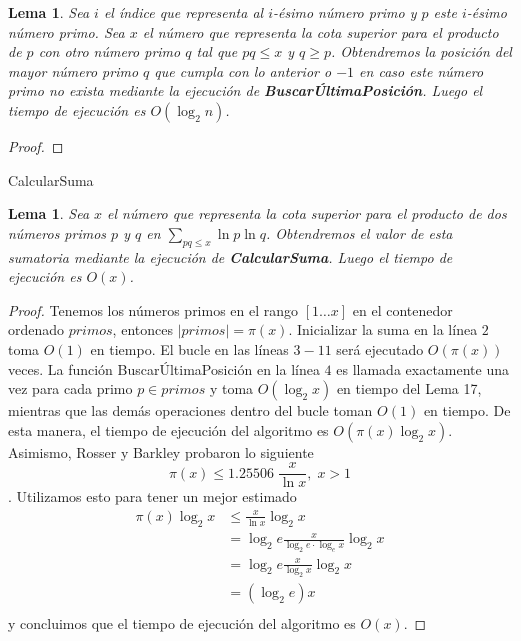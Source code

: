 \documentclass{article}
\newtheorem{lemma}[theorem]{Lema}
\theoremstyle{definition}
\theoremstyle{remark}
\begin{document}
\begin{lemma}
Sea $i$ el \'indice que representa al $i$-\'esimo n\'umero primo
y $p$ este $i$-\'esimo n\'umero primo.
Sea $x$ el n\'umero que representa la cota superior para el producto de $p$ con otro n\'umero primo $q$ tal que $pq \leq x$ y $q \geq p$.
Obtendremos la posici\'on del mayor n\'umero primo $q$ que cumpla con lo anterior o
$-1$ en caso este n\'umero primo no exista
mediante la ejecuci\'on de \textbf{Buscar\'UltimaPosici\'on}.
Luego el tiempo de ejecuci\'on es $O(\log_2 n)$.
\end{lemma}

\begin{proof}
\end{proof}

\begin{algorithm}[H]
\SetAlgoLined
\DontPrintSemicolon
{}
\caption{CalcularSuma\label{CS}}
\end{algorithm}

\begin{lemma}
Sea $x$ el n\'umero que representa la cota superior para el producto de dos n\'umeros primos
$p$ y $q$ en $\sum_{pq \leq x} \ln p \ln q$.
Obtendremos el valor de esta sumatoria mediante la ejecuci\'on de \textbf{CalcularSuma}.
Luego el tiempo de ejecuci\'on es $O(x)$.
\end{lemma}

\begin{proof}
Tenemos los n\'umeros primos en el rango $[1 \dots x]$ en el contenedor ordenado $primos$,
entonces $|primos| = \pi(x)$.
Inicializar la suma en la l\'inea $2$ toma $O(1)$ en tiempo.
El bucle en las l\'ineas $3-11$ ser\'a ejecutado $O(\pi(x))$ veces.
La funci\'on Buscar\'UltimaPosici\'on en la l\'inea $4$ es llamada exactamente una vez para cada primo $p \in primos$ y
toma $O(\log_2 x)$ en tiempo del Lema 17, mientras que las dem\'as operaciones dentro del bucle
toman $O(1)$ en tiempo.
De esta manera, el tiempo de ejecuci\'on del algoritmo es $O(\pi(x)\log_2 x)$.
Asimismo, Rosser y Barkley probaron lo siguiente \cite[Teorema 2, Corolario 1]{Chebyshev}
$$\pi(x) \leq 1.25506\;\frac{x}{\ln x},\;x > 1$$.
Utilizamos esto para tener un mejor estimado
\begin{align*}
    \pi(x)\log_2 x &\leq \frac{x}{\ln x} \log_2 x\\
    &= \log_2 e \frac{x}{\log_2 e \cdot \log_e x} \log_2 x\\
    &= \log_2 e \frac{x}{\log_2 x} \log_2 x\\
    &= (\log_2 e) x\\
\end{align*}
y concluimos que el tiempo de ejecuci\'on del algoritmo es $O(x)$.
\end{proof}
\end{document}
